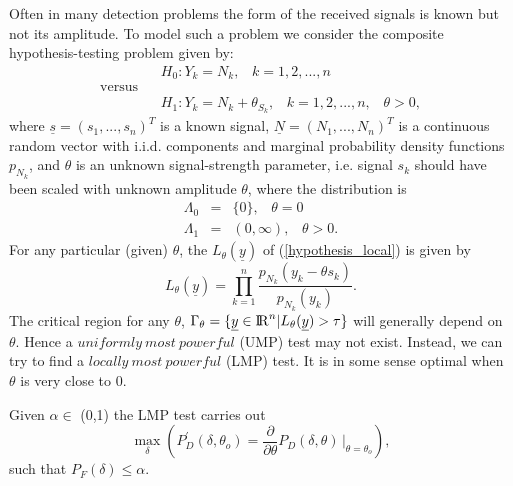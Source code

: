 \documentclass[a4paper,english,12pt]{article}
\begin{document}
\begin{exmp}
Often in many detection problems the form of the received signals is known but not its amplitude. To model such a problem we consider the composite hypothesis-testing problem given by:
\begin{equation}
\begin{split}
\label{hypothesis_local}
&H_{0}: Y_{k} = N_{k}, \hspace{10pt}k=1,2,...,n\\
\text{versus}\hspace{10pt}&
\\&H_{1}: Y_{k} = N_{k}+\theta_{S_{k}}, \hspace{10pt}k=1,2,...,n,\hspace{10pt}\theta>0,
\end{split}
\end{equation}
where $\underline{s}=(s_{1},...,s_{n})^T$ is a known signal, $\underline{N}=(N_{1},...,N_{n})^T$ is a continuous random vector with i.i.d. components and marginal probability density functions $p_{N_{k}}$, and $\theta$ is an unknown signal-strength parameter, i.e. signal $s_{k}$ should have been scaled with unknown amplitude $\theta$, where the distribution is
\begin{eqnarray}
\Lambda_{0}&=&\{0\},\hspace{10pt}\theta=0\nonumber\\
\Lambda_{1}&=&(0,\infty),\hspace{10pt}\theta>0.\nonumber
\end{eqnarray}
For any particular (given) $\theta$, the $L_{\theta}(\underline{y})$ of (\ref{hypothesis_local}) is given by
\begin{equation}
\label{L(y)_theta}
L_{\theta}(\underline{y})=\prod_{k=1}^{n}\frac{p_{N_{k}}(y_{k}-\theta s_{k})}{p_{N_{k}}(y_{k})}.
\end{equation}
The critical region for any $\theta$,
$\Gamma_{\theta}=\{\underline{y}\in{\rm I\!R}^n|L_{\theta}(\underline{y})>\tau\}$ will generally depend on $\theta$. Hence a $uniformly\ most\ powerful$ (UMP) test may not exist. Instead, we can try to find a $locally\ most\ powerful$ (LMP) test. It is in some sense optimal when $\theta$ is very close to 0.

\begin{note}
Given $\alpha\in$ (0,1) the LMP test carries out
\begin{equation}
\max_{\delta} \left(P_{D}^\prime(\delta,\theta_{o})=\frac{\partial}{\partial\theta}P_{D}(\delta,\theta)\hspace{2pt}\Bigg|_{\theta=\theta_{o}} \right),\nonumber
\end{equation}
such that $P_{F}(\delta)\leq\alpha$.


\end{note}
\end{exmp}
\end{document}
